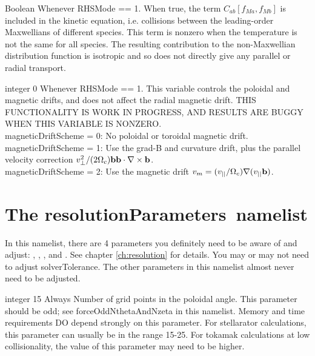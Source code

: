 \myhrule

{Boolean}
{\false}
{Whenever {\ttfamily RHSMode} == 1.}
{When true, the term $C_{ab}[ f_{Ma}, f_{Mb}]$ is included in the kinetic equation,
i.e. collisions between the leading-order Maxwellians of different species.  This term is nonzero
when the temperature is not the same for all species.  The resulting contribution to the non-Maxwellian
distribution function is isotropic and so does not directly give any parallel or radial transport.}

\myhrule

{integer}
{0}
{Whenever {\ttfamily RHSMode} == 1.}
{This variable controls the poloidal and magnetic drifts, and does not affect the radial magnetic drift.
THIS FUNCTIONALITY IS WORK IN PROGRESS, AND RESULTS ARE BUGGY WHEN THIS VARIABLE IS NONZERO.\\

{\ttfamily magneticDriftScheme} = 0:  No poloidal or toroidal magnetic drift.\\

{\ttfamily magneticDriftScheme} = 1: Use the grad-B and curvature drift, plus the parallel velocity correction $v_{\perp}^2/(2 \Omega_c) {\mathbf b} {\mathbf b} \cdot \nabla \times {\mathbf b}$.\\

{\ttfamily magneticDriftScheme} = 2:   Use the magnetic drift $v_m = (v_{||} / \Omega_c) \nabla (v_{||} {\mathbf b})$.
}








\section{The {\ttfamily resolutionParameters}~namelist}
\label{sec:resolutionParameters}

In this namelist, there are 4 parameters you definitely need to be aware of and adjust: \Ntheta, \Nzeta, \Nxi, and \Nx.  
See chapter \ref{ch:resolution} for details. You may or may not
need to adjust {\ttfamily solverTolerance}.  The other parameters in this namelist almost never need to be adjusted.

\myhrule

{integer}
{15}
{Always}
{Number of grid points in the poloidal angle. 
This parameter should be odd; see {\ttfamily forceOddNthetaAndNzeta} in this namelist.
Memory and time requirements DO depend strongly on this parameter.
For stellarator calculations, this parameter can usually be in the range 15-25.
For tokamak calculations at low collisionality, the value of this parameter may need to be higher.}



